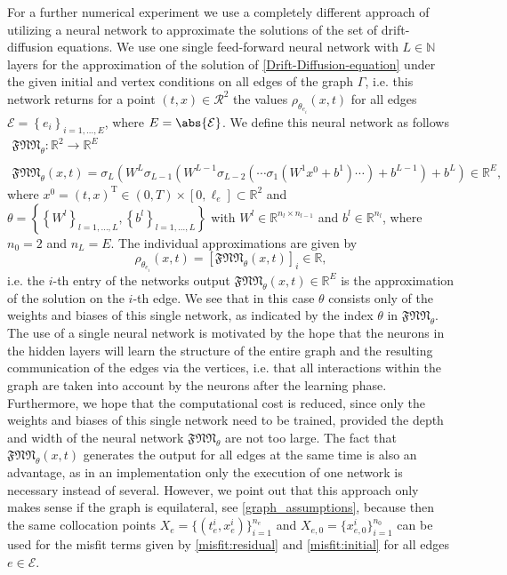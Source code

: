 For a further numerical experiment we use a completely different approach of utilizing a neural network to approximate the solutions of the set of drift-diffusion equations. We use one single feed-forward neural network with $L \in \mathbb{N}$ layers for the approximation of the solution of \cref{Drift-Diffusion-equation} under the given initial and vertex conditions on all edges of the graph $\Gamma$, i.e. this network returns for a point $(t,x) \in \mathcal{R}^2$ the values $\rho_{\theta_{e_i}}(x, t)$ for all edges $\mathcal{E} = \left\{ e_i \right\}_{i = 1, \ldots, E}$, where $E = \abs{\mathcal{E}}$. We define this neural network as follows
\begin{gather}
    \label{one_for_all}
    \mathfrak{FNN}_{\theta} \colon \mathbb{R}^2 \to \mathbb{R}^E \\
    \\
    \mathfrak{FNN}_{\theta}(x, t) = \sigma_L(W^L \sigma_{L-1}(W^{L-1}\sigma_{L-2}(\cdots \sigma_{1}(W^{1}x^0 +b^1) \cdots) + b^{L-1}) + b^{L}) \in \mathbb{R}^E, 
\end{gather}
where $x^0 = (t, x)^{\mathrm{T}} \in (0, T) \times [0, \ell_e] \subset \mathbb{R}^2$ and $\theta = \left\{ \left\{ W^l \right\}_{l = 1, \ldots, L}, \left\{ b^l \right\}_{l = 1, \ldots, L} \right\}$ with $W^l \in \mathbb{R}^{n_l \times n_{l-1}}$ and $b^l \in \mathbb{R}^{n_l}$, where $n_0 = 2$ and $n_L = E$. The individual approximations are given by 
\begin{equation*}
    \rho_{\theta_{e_i}}(x, t) = \left[ \mathfrak{FNN}_{\theta}(x, t) \right]_i \in \mathbb{R},
\end{equation*}
i.e. the $i$-th entry of the networks output $\mathfrak{FNN}_{\theta}(x, t) \in \mathbb{R}^E$ is the approximation of the solution on the $i$-th edge. We see that in this case $\theta$ consists only of the weights and biases of this single network, as indicated by the index $\theta$ in $\mathfrak{FNN}_{\theta}$. \\
The use of a single neural network is motivated by the hope that the neurons in the hidden layers will learn the structure of the entire graph and the resulting communication of the edges via the vertices, i.e. that all interactions within the graph are taken into account by the neurons after the learning phase. Furthermore, we hope that the computational cost is reduced, since only the weights and biases of this single network need to be trained, provided the depth and width of the neural network $\mathfrak{FNN}_{\theta}$ are not too large. The fact that $\mathfrak{FNN}_{\theta}(x, t)$ generates the output for all edges at the same time is also an advantage, as in an implementation only the execution of one network is necessary instead of several. However, we point out that this approach only makes sense if the graph is equilateral, see \cref{graph_assumptions}, because then the same collocation points $X_e = \{ \left( t_e^i, x_e^i \right)\}_{i=1}^{n_e}$ and $X_{e,0} = \{x_{e,0}^i\}_{i=1}^{n_0}$ can be used for the misfit terms given by \cref{misfit:residual} and \cref{misfit:initial} for all edges $e \in \mathcal{E}$. 


